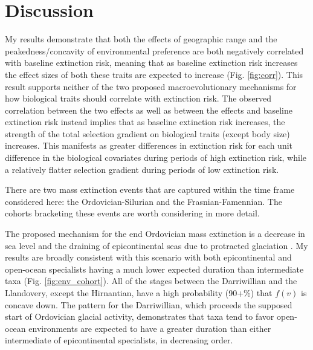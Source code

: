 \documentclass[12pt,letterpaper]{article}
\begin{document}
\section{Discussion}

My results demonstrate that both the effects of geographic range and the peakedness/concavity of environmental preference are both negatively correlated with baseline extinction risk, meaning that as baseline extinction risk increases the effect sizes of both these traits are expected to increase (Fig. \ref{fig:corr}). This result supports neither of the two proposed macroevolutionary mechanisms for how biological traits should correlate with extinction risk. The observed correlation between the two effects as well as between the effects and baseline extinction risk instead implies that as baseline extinction risk increases, the strength of the total selection gradient on biological traits (except body size) increases. This manifests as greater differences in extinction risk for each unit difference in the biological covariates during periods of high extinction risk, while a relatively flatter selection gradient during periods of low extinction risk.

There are two mass extinction events that are captured within the time frame considered here: the Ordovician-Silurian and the Frasnian-Famennian. The cohorts bracketing these events are worth considering in more detail.


The proposed mechanism for the end Ordovician mass extinction is a decrease in sea level and the draining of epicontinental seas due to protracted glaciation \citep{Sheehan2001b,Johnson1974}. My results are broadly consistent with this scenario with both epicontinental and open-ocean specialists having a much lower expected duration than intermediate taxa (Fig. \ref{fig:env_cohort}). All of the stages between the Darriwillian and the Llandovery, except the Hirnantian, have a high probability (90+\%) that \(f(v)\) is concave down. The pattern for the Darriwillian, which proceeds the supposed start of Ordovician glacial activity, demonstrates that taxa tend to favor open-ocean environments are expected to have a greater duration than either intermediate of epicontinental specialists, in decreasing order.
\end{document}
